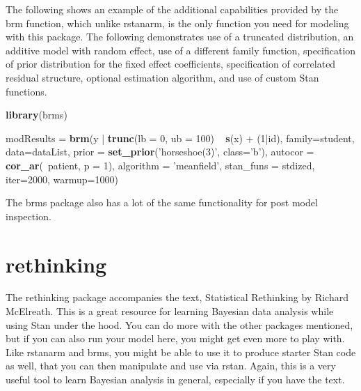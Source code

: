 \documentclass[]{book}
\newenvironment{Shaded}{\begin{snugshade}}{\end{snugshade}}
\newcommand{\KeywordTok}[1]{\textcolor[rgb]{0.13,0.29,0.53}{\textbf{{#1}}}}
\newcommand{\DataTypeTok}[1]{\textcolor[rgb]{0.13,0.29,0.53}{{#1}}}
\newcommand{\DecValTok}[1]{\textcolor[rgb]{0.00,0.00,0.81}{{#1}}}
\newcommand{\StringTok}[1]{\textcolor[rgb]{0.31,0.60,0.02}{{#1}}}
\newcommand{\NormalTok}[1]{{#1}}
\begin{document}
The following shows an example of the additional capabilities provided
by the {brm} function, which unlike rstanarm, is the only function you
need for modeling with this package. The following demonstrates use of a
truncated distribution, an additive model with random effect, use of a
different family function, specification of prior distribution for the
fixed effect coefficients, specification of correlated residual
structure, optional estimation algorithm, and use of custom Stan
functions.

\begin{Shaded}
\begin{Highlighting}[]
\KeywordTok{library}\NormalTok{(brms)}

\NormalTok{modResults =}\StringTok{ }\KeywordTok{brm}\NormalTok{(y |}\StringTok{ }\KeywordTok{trunc}\NormalTok{(}\DataTypeTok{lb =} \DecValTok{0}\NormalTok{, }\DataTypeTok{ub =} \DecValTok{100}\NormalTok{) ~}\StringTok{ }\KeywordTok{s}\NormalTok{(x) +}\StringTok{ }\NormalTok{(}\DecValTok{1}\NormalTok{|id), }\DataTypeTok{family=}\NormalTok{student, }\DataTypeTok{data=}\NormalTok{dataList, }
                 \DataTypeTok{prior =} \KeywordTok{set_prior}\NormalTok{(}\StringTok{'horseshoe(3)'}\NormalTok{, }\DataTypeTok{class=}\StringTok{'b'}\NormalTok{),}
                 \DataTypeTok{autocor =} \KeywordTok{cor_ar}\NormalTok{(~patient, }\DataTypeTok{p =} \DecValTok{1}\NormalTok{),}
                 \DataTypeTok{algorithm =} \StringTok{'meanfield'}\NormalTok{,}
                 \DataTypeTok{stan_funs =} \NormalTok{stdized,}
                 \DataTypeTok{iter=}\DecValTok{2000}\NormalTok{, }\DataTypeTok{warmup=}\DecValTok{1000}\NormalTok{)}
\end{Highlighting}
\end{Shaded}

The {brms} package also has a lot of the same functionality for post
model inspection.

\section{rethinking}\label{rethinking}

The {rethinking} package accompanies the text, Statistical Rethinking by
Richard McElreath. This is a great resource for learning Bayesian data
analysis while using Stan under the hood. You can do more with the other
packages mentioned, but if you can also run your model here, you might
get even more to play with. Like {rstanarm} and {brms}, you might be
able to use it to produce starter Stan code as well, that you can then
manipulate and use via {rstan}. Again, this is a very useful tool to
learn Bayesian analysis in general, especially if you have the text.
\end{document}
